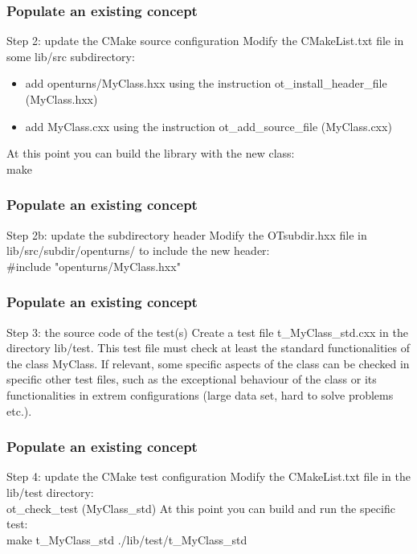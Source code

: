 \documentclass[8pt]{beamer}
\begin{document}
\begin{frame}
  \frametitle{Populate an existing concept}
  \begin{block}{Step 2: update the CMake source configuration}
    Modify the CMakeList.txt file in some lib/src subdirectory:
    \begin{itemize}
    \item add openturns/MyClass.hxx using the instruction {\ttfamily ot\_install\_header\_file (MyClass.hxx)}
    \item add MyClass.cxx using the instruction {\ttfamily ot\_add\_source\_file (MyClass.cxx)}
    \end{itemize}
    At this point you can build the library with the new class:\\
     {\ttfamily make}
  \end{block}
\end{frame}
\begin{frame}
  \frametitle{Populate an existing concept}
  \begin{block}{Step 2b: update the subdirectory header}
    Modify the OTsubdir.hxx file in lib/src/subdir/openturns/ to include the new header:\\
    {\ttfamily \#include "openturns/MyClass.hxx"}

  \end{block}
\end{frame}
\begin{frame}
  \frametitle{Populate an existing concept}
  \begin{block}{Step 3: the source code of the test(s)}
    Create a test file t\_MyClass\_std.cxx in the directory lib/test. This test file must check at least the standard functionalities of the class MyClass. If relevant, some specific aspects of the class can be checked in specific other test files, such as the exceptional behaviour of the class or its functionalities in extrem configurations (large data set, hard to solve problems etc.).
  \end{block}
\end{frame}
\begin{frame}
  \frametitle{Populate an existing concept}
  \begin{block}{Step 4: update the CMake test configuration}
    Modify the CMakeList.txt file in the lib/test directory:\\
    {\ttfamily ot\_check\_test (MyClass\_std)}
    At this point you can build and run the specific test:\\
     {\ttfamily make t\_MyClass\_std}
     \newline
     {\ttfamily ./lib/test/t\_MyClass\_std}
  \end{block}
  
\end{frame}
\end{document}
